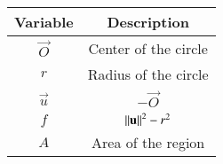 \begin{tabular}[12pt]{ |c| c|}
    \hline
    \textbf{Variable} & \textbf{Description}\\ 
    \hline
	$\vec{O}$ & Center of the circle\\
    \hline
    $r$ & Radius of the circle\\
    \hline
    $\vec{u}$ & $-\vec{O}$\\
    \hline
    $f$ & $\left\lVert\mathbf{u}\right\rVert^2 - r^2$\\
    \hline
    $A$ & Area of the region\\
    \hline
\end{tabular}